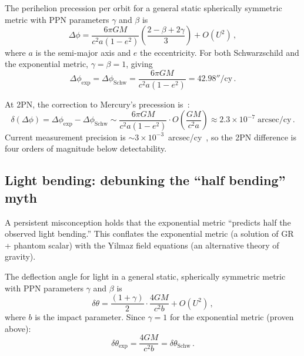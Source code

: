 \documentclass[aps,prd,preprint,superscriptaddress,longbibliography]{revtex4-2}
\begin{document}
The perihelion precession per orbit for a general static spherically
symmetric metric with PPN parameters $\gamma$ and $\beta$ is
\begin{equation}
  \Delta\phi = \frac{6\pi GM}{c^2 a(1-e^2)}
  \left(\frac{2-\beta+2\gamma}{3}\right)
  + O(U^2)\,,
  \label{eq:precession}
\end{equation}
where $a$ is the semi-major axis and $e$ the eccentricity.  For both
Schwarzschild and the exponential metric, $\gamma = \beta = 1$, giving
\begin{equation}
  \Delta\phi_{\mathrm{exp}} = \Delta\phi_{\mathrm{Schw}}
  = \frac{6\pi GM}{c^2 a(1-e^2)} = 42.98''/\mathrm{cy}\,.
  \label{eq:Mercury}
\end{equation}

At 2PN, the correction to Mercury's precession is~\cite{Mychelkin2024}:
\begin{equation}
  \delta(\Delta\phi) = \Delta\phi_{\mathrm{exp}} - \Delta\phi_{\mathrm{Schw}}
  \sim \frac{6\pi GM}{c^2 a(1-e^2)}\cdot O\!\left(\frac{GM}{c^2 a}\right)
  \approx 2.3\times 10^{-7}\;\mathrm{arcsec/cy}\,.
  \label{eq:Mercury_2PN}
\end{equation}
Current measurement precision is
$\sim 3 \times 10^{-3}$~arcsec/cy~\cite{Bertotti2003}, so the 2PN
difference is four orders of magnitude below detectability.

\subsection{Light bending: debunking the ``half bending'' myth}
\label{sec:light_bending}

A persistent misconception holds that the exponential metric
``predicts half the observed light bending.''  This conflates the
exponential metric (a solution of GR + phantom scalar) with the
Yilmaz field equations (an alternative theory of gravity).

The deflection angle for light in a general static, spherically
symmetric metric with PPN parameters $\gamma$ and $\beta$ is
\begin{equation}
  \delta\theta = \frac{(1+\gamma)}{2}\cdot\frac{4GM}{c^2 b}
  + O(U^2)\,,
  \label{eq:bending}
\end{equation}
where $b$ is the impact parameter.  Since $\gamma = 1$ for the
exponential metric (proven above):
\begin{equation}
  \delta\theta_{\mathrm{exp}} = \frac{4GM}{c^2 b}
  = \delta\theta_{\mathrm{Schw}}\,.
  \label{eq:bending_full}
\end{equation}
\end{document}
